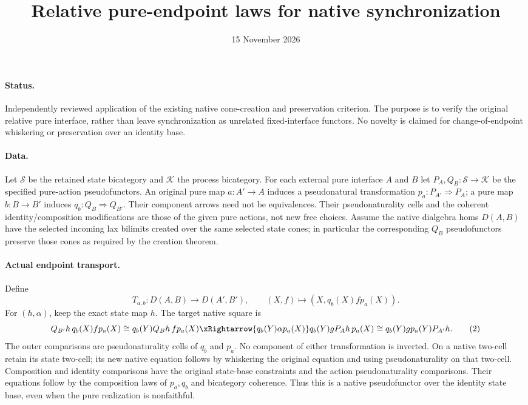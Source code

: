 \documentclass{article}
\title{Relative pure-endpoint laws for native synchronization}
\date{15 November 2026}
\begin{document}
\maketitle
\paragraph{Status.} Independently reviewed application of the existing native cone-creation and preservation criterion. The purpose is to verify the original relative pure interface, rather than leave synchronization as unrelated fixed-interface functors. No novelty is claimed for change-of-endpoint whiskering or preservation over an identity base.

\paragraph{Data.} Let $\mathcal S$ be the retained state bicategory and $\mathcal K$ the process bicategory. For each external pure interface $A$ and $B$ let $P_A,Q_B:\mathcal S\to\mathcal K$ be the specified pure-action pseudofunctors. An original pure map $a:A'\to A$ induces a pseudonatural transformation $p_a:P_{A'}\Rightarrow P_A$; a pure map $b:B\to B'$ induces $q_b:Q_B\Rightarrow Q_{B'}$. Their component arrows need not be equivalences. Their pseudonaturality cells and the coherent identity/composition modifications are those of the given pure actions, not new free choices. Assume the native dialgebra homs $D(A,B)$ have the selected incoming lax bilimits created over the same selected state cones; in particular the corresponding $Q_B$ pseudofunctors preserve those cones as required by the creation theorem.

\paragraph{Actual endpoint transport.} Define
\[
 T_{a,b}:D(A,B)\longrightarrow D(A',B'),\qquad
 (X,f)\longmapsto(X,q_b(X)f p_a(X)).
\tag{1}
\]
For $(h,\alpha)$, keep the exact state map $h$. The target native square is
\[
 Q_{B'}h\,q_b(X)f p_a(X)
 \cong q_b(Y)Q_Bh\,f p_a(X)
 \xRightarrow{q_b(Y)\alpha p_a(X)}
 q_b(Y)gP_Ah\,p_a(X)
 \cong q_b(Y)g p_a(Y)P_{A'}h.
\tag{2}
\]
The outer comparisons are pseudonaturality cells of $q_b$ and $p_a$. No component of either transformation is inverted. On a native two-cell retain its state two-cell; its new native equation follows by whiskering the original equation and using pseudonaturality on that two-cell. Composition and identity comparisons have the original state-base constraints and the action pseudonaturality comparisons. Their equations follow by the composition laws of $p_a,q_b$ and bicategory coherence. Thus this is a native pseudofunctor over the identity state base, even when the pure realization is nonfaithful.
\end{document}
